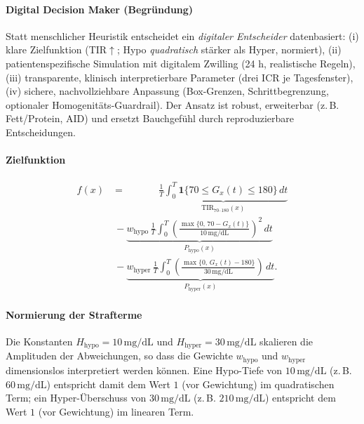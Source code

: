 \documentclass[ngerman,a4paper,12pt,pdftex]{article}
\newcommand{\Ind}{\mathbf{1}}
\newcommand{\Hhypo}{10\,\mathrm{mg/dL}}
\newcommand{\Hhyper}{30\,\mathrm{mg/dL}}
\begin{document}
\paragraph{Digital Decision Maker (Begründung)}
Statt menschlicher Heuristik entscheidet ein \emph{digitaler Entscheider} datenbasiert: (i) klare Zielfunktion (TIR$\uparrow$; Hypo \emph{quadratisch} stärker als Hyper, normiert), (ii) patientenspezifische Simulation mit digitalem Zwilling (24 h, realistische Regeln), (iii) transparente, klinisch interpretierbare Parameter (drei ICR je Tagesfenster), (iv) sichere, nachvollziehbare Anpassung (Box-Grenzen, Schrittbegrenzung, optionaler Homogenitäts-Guardrail). Der Ansatz ist robust, erweiterbar (z.\,B. Fett/Protein, AID) und ersetzt Bauchgefühl durch reproduzierbare Entscheidungen.

\paragraph{Zielfunktion}
\begin{align}
f(x)
&= \phantom{-\,w_{\mathrm{hypo}}\,}\underbrace{\frac{1}{T}\int_{0}^{T}\Ind\{70 \le G_{x}(t) \le 180\}\,dt}_{\mathrm{TIR}_{70\text{--}180}(x)} \nonumber\\
&\ - \underbrace{w_{\mathrm{hypo}}\,\frac{1}{T}\int_{0}^{T}\left(\frac{\max\{0,\,70 - G_{x}(t)\}}{\Hhypo}\right)^{2}\,dt}_{P_{\mathrm{hypo}}(x)} \nonumber\\
&\ - \underbrace{w_{\mathrm{hyper}}\,\frac{1}{T}\int_{0}^{T}\left(\frac{\max\{0,\,G_{x}(t) - 180\}}{\Hhyper}\right)\,dt}_{P_{\mathrm{hyper}}(x)}.
\end{align}

\paragraph{Normierung der Strafterme}

Die Konstanten $H_{\text{hypo}}=\Hhypo$ und $H_{\text{hyper}}=\Hhyper$ skalieren die Amplituden der Abweichungen, so dass die Gewichte $w_{\mathrm{hypo}}$ und $w_{\mathrm{hyper}}$ dimensionslos interpretiert werden können. Eine Hypo-Tiefe von $10\,\mathrm{mg/dL}$ (z.\,B. $60\,\mathrm{mg/dL}$) entspricht damit dem Wert $1$ (vor Gewichtung) im quadratischen Term; ein Hyper-Überschuss von $30\,\mathrm{mg/dL}$ (z.\,B. $210\,\mathrm{mg/dL}$) entspricht dem Wert $1$ (vor Gewichtung) im linearen Term.
\end{document}
